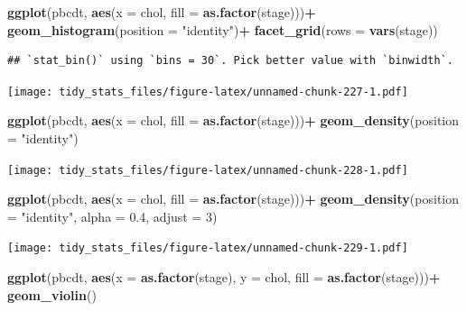 \documentclass[]{book}
\newenvironment{Shaded}{\begin{snugshade}}{\end{snugshade}}
\newcommand{\KeywordTok}[1]{\textcolor[rgb]{0.13,0.29,0.53}{\textbf{#1}}}
\newcommand{\DataTypeTok}[1]{\textcolor[rgb]{0.13,0.29,0.53}{#1}}
\newcommand{\DecValTok}[1]{\textcolor[rgb]{0.00,0.00,0.81}{#1}}
\newcommand{\FloatTok}[1]{\textcolor[rgb]{0.00,0.00,0.81}{#1}}
\newcommand{\StringTok}[1]{\textcolor[rgb]{0.31,0.60,0.02}{#1}}
\newcommand{\OperatorTok}[1]{\textcolor[rgb]{0.81,0.36,0.00}{\textbf{#1}}}
\newcommand{\NormalTok}[1]{#1}
\begin{document}
\begin{Shaded}
\begin{Highlighting}[]
\KeywordTok{ggplot}\NormalTok{(pbcdt, }\KeywordTok{aes}\NormalTok{(}\DataTypeTok{x =}\NormalTok{ chol, }\DataTypeTok{fill =} \KeywordTok{as.factor}\NormalTok{(stage)))}\OperatorTok{+}
\StringTok{  }\KeywordTok{geom_histogram}\NormalTok{(}\DataTypeTok{position =} \StringTok{"identity"}\NormalTok{)}\OperatorTok{+}
\StringTok{  }\KeywordTok{facet_grid}\NormalTok{(}\DataTypeTok{rows =} \KeywordTok{vars}\NormalTok{(stage))}
\end{Highlighting}
\end{Shaded}

\begin{verbatim}
## `stat_bin()` using `bins = 30`. Pick better value with `binwidth`.
\end{verbatim}

\texttt{[image: tidy\_stats\_files/figure-latex/unnamed-chunk-227-1.pdf]}

\begin{Shaded}
\begin{Highlighting}[]
\KeywordTok{ggplot}\NormalTok{(pbcdt, }\KeywordTok{aes}\NormalTok{(}\DataTypeTok{x =}\NormalTok{ chol, }\DataTypeTok{fill =} \KeywordTok{as.factor}\NormalTok{(stage)))}\OperatorTok{+}
\StringTok{  }\KeywordTok{geom_density}\NormalTok{(}\DataTypeTok{position =} \StringTok{"identity"}\NormalTok{)}
\end{Highlighting}
\end{Shaded}

\texttt{[image: tidy\_stats\_files/figure-latex/unnamed-chunk-228-1.pdf]}

\begin{Shaded}
\begin{Highlighting}[]
\KeywordTok{ggplot}\NormalTok{(pbcdt, }\KeywordTok{aes}\NormalTok{(}\DataTypeTok{x =}\NormalTok{ chol, }\DataTypeTok{fill =} \KeywordTok{as.factor}\NormalTok{(stage)))}\OperatorTok{+}
\StringTok{  }\KeywordTok{geom_density}\NormalTok{(}\DataTypeTok{position =} \StringTok{"identity"}\NormalTok{, }\DataTypeTok{alpha =} \FloatTok{0.4}\NormalTok{, }\DataTypeTok{adjust =} \DecValTok{3}\NormalTok{)}
\end{Highlighting}
\end{Shaded}

\texttt{[image: tidy\_stats\_files/figure-latex/unnamed-chunk-229-1.pdf]}

\begin{Shaded}
\begin{Highlighting}[]
\KeywordTok{ggplot}\NormalTok{(pbcdt, }\KeywordTok{aes}\NormalTok{(}\DataTypeTok{x =} \KeywordTok{as.factor}\NormalTok{(stage), }\DataTypeTok{y =}\NormalTok{ chol, }\DataTypeTok{fill =} \KeywordTok{as.factor}\NormalTok{(stage)))}\OperatorTok{+}
\StringTok{  }\KeywordTok{geom_violin}\NormalTok{()}
\end{Highlighting}
\end{Shaded}
\end{document}
